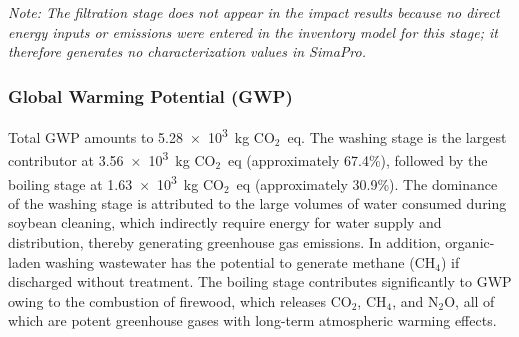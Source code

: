 \documentclass[12pt,a4paper]{article}
\begin{document}
\begin{table}[H]
\centering
\caption{Environmental Impact of Tofu Production per Batch by Production Stage.}
\label{tab:lcia}
\small
{}
\end{table}

\noindent\textit{Note: The filtration stage does not appear in the impact results because no direct
energy inputs or emissions were entered in the inventory model for this stage; it therefore generates
no characterization values in SimaPro.}

\subsubsection{Global Warming Potential (GWP)}

Total GWP amounts to \num{5.28e3}~kg CO$_2$~eq. The washing stage is the largest contributor at
\num{3.56e3}~kg CO$_2$~eq (approximately 67.4\%), followed by the boiling stage at
\num{1.63e3}~kg CO$_2$~eq (approximately 30.9\%). The dominance of the washing stage is attributed to
the large volumes of water consumed during soybean cleaning, which indirectly require energy for water
supply and distribution, thereby generating greenhouse gas emissions. In addition, organic-laden washing
wastewater has the potential to generate methane (CH$_4$) if discharged without treatment. The boiling
stage contributes significantly to GWP owing to the combustion of firewood, which releases CO$_2$,
CH$_4$, and N$_2$O, all of which are potent greenhouse gases with long-term atmospheric warming effects.
\end{document}
